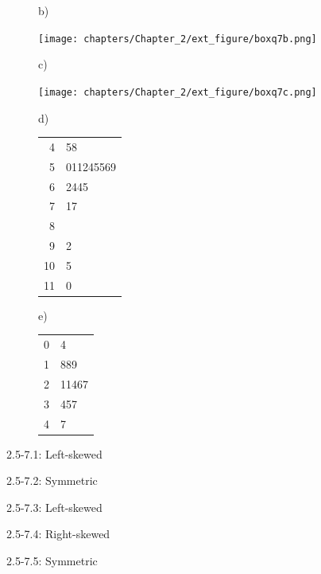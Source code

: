 \documentclass[11pt, chapterprefix=true]{scrbook}\usepackage[]{graphicx}\usepackage[]{color}
\begin{document}
\begin{exercises}
\begin{exercise}
\begin{figure}[ht]
\begin{minipage}[ht]{3cm}
  b)

  \texttt{[image: chapters/Chapter\_2/ext\_figure/boxq7b.png]}
  \end{minipage} \hfill
  \begin{minipage}[ht]{3cm}

  c)

  \texttt{[image: chapters/Chapter\_2/ext\_figure/boxq7c.png]}
  \end{minipage} \hfill
  \begin{minipage}[ht]{3cm}

  d)

    \begin{tabular}{@{} r|l @{}} \hline
  4 & 58 \\
  5 & 011245569 \\
  6 & 2445 \\
  7 & 17 \\
  8 &  \\
  9 & 2 \\
  10 & 5 \\
  11 & 0
    \end{tabular}
  \end{minipage} \hfill
  \begin{minipage}[ht]{3cm}
  e)

  \begin{tabular}{@{} r | l @{}} \hline
  0 & 4 \\
  1 & 889 \\
  2 & 11467 \\
  3 & 457 \\
  4 & 7
  \end{tabular}
  \end{minipage}

\end{figure}

\end{exercise}
\begin{solution}  %

2.5-7.1: Left-skewed

2.5-7.2: Symmetric

2.5-7.3: Left-skewed

2.5-7.4: Right-skewed

2.5-7.5: Symmetric

\end{solution}


  \begin{exercise}  %


\end{exercise}
\end{exercises}
\end{document}
